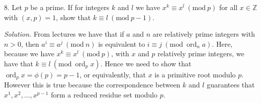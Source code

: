 \documentclass{article}
\newcommand{\Mod}[1]{\ (\mathrm{mod}\ #1)}
\DeclareMathOperator{\ord}{ord}
\newcommand{\Z}{\mathbb{Z}}
\begin{document}
\newpage

8. Let $p$ be a prime. If for integers $k$ and $l$ we have
$x^k \equiv x^l \Mod{p}$ for all $x \in \Z$ with $(x, p) = 1$,
show that $k \equiv l \Mod{p - 1}$.

\textit{Solution.}
From lectures we have that if $a$ and $n$ are relatively prime integers
with $n > 0$, then $a^i \equiv a^j \Mod{n}$ is equivalent to
$i \equiv j \Mod{\ord_n a}$. Here, because we have $x^k \equiv x^l \Mod{p}$,
with $x$ and $p$ relatively prime integers, we have that
$k \equiv l \Mod{\ord_p x}$. Hence we need to show that $\ord_p x = \phi(p) = p - 1$,
or equivalently, that $x$ is a primitive root modulo $p$. However
this is true because the correspondence between $k$ and $l$ guarantees
that $x^1, x^2, \ldots, x^{p - 1}$ form a reduced residue set modulo $p$.

\newpage
\end{document}
